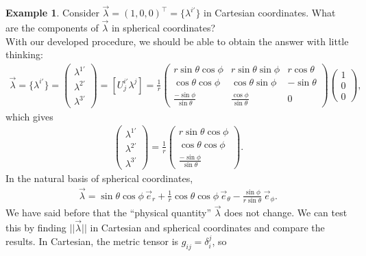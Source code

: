 \documentclass{article}
\theoremstyle{definition}
\newtheorem{exmp}{Example}[section]
\begin{document}
\begin{exmp}
	Consider $\vec{\lambda} = (1,0,0)^\top = \{\lambda^{i'}\}$ in Cartesian coordinates. What are the components of $\vec{\lambda}$ in spherical coordinates? \\
	
	With our developed procedure, we should be able to obtain the answer with little thinking:
	\begin{align*}
	\vec{\lambda} = \{ \lambda^{i'} \} = 
	\begin{pmatrix}
	\lambda^{1'} \\ \lambda^{2'} \\ \lambda^{3'}
	\end{pmatrix}
	=
	[U^{i'}_j\lambda^j]
	= 
	\frac{1}{r}
	\begin{pmatrix}
	r\sin\theta\cos\phi & r\sin\theta\sin\phi & r\cos\theta\\
	\cos\theta\cos\phi & \cos\theta\sin\phi & -\sin\theta\\
	\frac{-\sin\phi}{\sin\theta} & \frac{\cos\phi}{\sin\theta} & 0
	\end{pmatrix}
	\begin{pmatrix}
	1 \\ 0 \\ 0
	\end{pmatrix},
	\end{align*}
	which gives
	\begin{align*}
	\begin{pmatrix}
	\lambda^{1'} \\ \lambda^{2'} \\ \lambda^{3'}
	\end{pmatrix}
	=
	\frac{1}{r}
	\begin{pmatrix}
	r\sin\theta\cos\phi\\
	\cos\theta\cos\phi\\
	\frac{-\sin\phi}{\sin\theta}
	\end{pmatrix}.
	\end{align*}
	In the natural basis of spherical coordinates, 
	\begin{align*}
	\vec{\lambda} = \sin\theta\cos\phi\,\vec{e}_r + \frac{1}{r}\cos\theta\cos\phi\,\vec{e}_\theta - \frac{\sin\phi}{r\sin\theta}\,\vec{e}_\phi.
	\end{align*}
	We have said before that the ``physical quantity'' $\vec{\lambda}$ does not change. We can test this by finding $\vert\vert \vec{\lambda} \vert\vert$ in Cartesian and spherical coordinates and compare the results. In Cartesian, the metric tensor is $g_{ij} = \delta^j_i$, so

\end{exmp}
\end{document}
